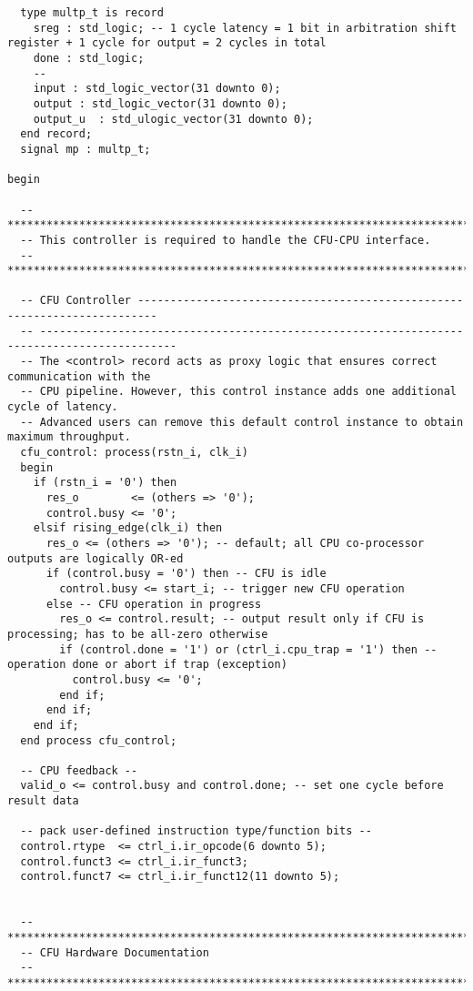 \begin{code}
\begin{verbatim}
  type multp_t is record
    sreg : std_logic; -- 1 cycle latency = 1 bit in arbitration shift register + 1 cycle for output = 2 cycles in total
    done : std_logic;
    --
    input : std_logic_vector(31 downto 0);
    output : std_logic_vector(31 downto 0);
    output_u  : std_ulogic_vector(31 downto 0);
  end record;
  signal mp : multp_t;

begin

  -- **************************************************************************************************************************
  -- This controller is required to handle the CFU-CPU interface.
  -- **************************************************************************************************************************

  -- CFU Controller -------------------------------------------------------------------------
  -- -------------------------------------------------------------------------------------------
  -- The <control> record acts as proxy logic that ensures correct communication with the
  -- CPU pipeline. However, this control instance adds one additional cycle of latency.
  -- Advanced users can remove this default control instance to obtain maximum throughput.
  cfu_control: process(rstn_i, clk_i)
  begin
    if (rstn_i = '0') then
      res_o        <= (others => '0');
      control.busy <= '0';
    elsif rising_edge(clk_i) then
      res_o <= (others => '0'); -- default; all CPU co-processor outputs are logically OR-ed
      if (control.busy = '0') then -- CFU is idle
        control.busy <= start_i; -- trigger new CFU operation
      else -- CFU operation in progress
        res_o <= control.result; -- output result only if CFU is processing; has to be all-zero otherwise
        if (control.done = '1') or (ctrl_i.cpu_trap = '1') then -- operation done or abort if trap (exception)
          control.busy <= '0';
        end if;
      end if;
    end if;
  end process cfu_control;

  -- CPU feedback --
  valid_o <= control.busy and control.done; -- set one cycle before result data

  -- pack user-defined instruction type/function bits --
  control.rtype  <= ctrl_i.ir_opcode(6 downto 5);
  control.funct3 <= ctrl_i.ir_funct3;
  control.funct7 <= ctrl_i.ir_funct12(11 downto 5);


  -- **************************************************************************************************************************
  -- CFU Hardware Documentation
  -- **************************************************************************************************************************


\end{verbatim}
\end{code}

